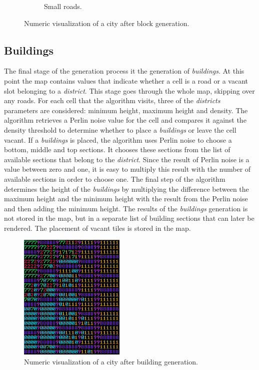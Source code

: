 \begin{figure}[h]
\begin{subfigure}{0.5\textwidth}
			\caption{Small roads.}
			\label{fig:map-small-roads}
		\end{subfigure}
		\caption{Numeric visualization of a city after block generation.}
		\label{fig:map-main-and-small-roads}
	\end{figure}
		
	\subsection{Buildings}
		The final stage of the generation process it the generation of \textit{buildings}. At this point the map contains values that indicate whether a cell is a road or a vacant slot belonging to a \textit{district}. This stage goes through the whole map, skipping over any roads. For each cell that the algorithm visits, three of the \textit{districts} parameters are considered: minimum height, maximum height and density. The algorithm retrieves a Perlin noise value for the cell and compares it against the density threshold to determine whether to place a \textit{buildings} or leave the cell vacant. If a \textit{buildings} is placed, the algorithm uses Perlin noise to choose a bottom, middle and top sections. It chooses these sections from the list of available sections that belong to the \textit{district}. Since the result of Perlin noise is a value between zero and one, it is easy to multiply this result with the number of available sections in order to choose one. The final step of the algorithm determines the height of the \textit{buildings} by multiplying the difference between the maximum height and the minimum height with the result from the Perlin noise and then adding the minimum height. The results of the \textit{buildings} generation is not stored in the map, but in a separate list of building sections that can later be rendered. The placement of vacant tiles is stored in the map.
		
	\begin{figure}
		\centering
		\includegraphics[width=0.45\textwidth]{"Images/map grass colored"}
		\caption{Numeric visualization of a city after building generation.}
		\label{fig:map-grass}
	\end{figure}

